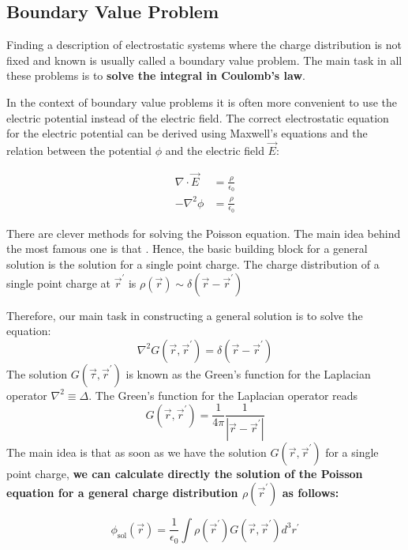 \subsection{Boundary Value Problem}
Finding a description of electrostatic systems where the charge distribution is not fixed and known is usually called a boundary value problem. The main task in all these problems is to \textbf{solve the integral in Coulomb’s law}.

In the context of boundary value problems it is often more convenient to use the electric potential instead of the electric field. The correct electrostatic equation for the electric potential can be derived using Maxwell's equations and the relation between the potential $\phi$ and the electric field $\vec{E}$:
\begin{qt}
\begin{equation}
\begin{aligned}
\nabla \cdot \vec{E} &=\frac{\rho}{\epsilon_{0}} \\
-\nabla^{2} \phi &=\frac{\rho}{\epsilon_{0}}
\end{aligned}
\end{equation}
\end{qt}
There are clever methods for solving the Poisson equation. The main idea behind the most famous one is that \textbf{}. Hence, the basic building block for a general solution is the solution for a single point charge. The charge distribution of a single point charge at $\vec{r}^{\prime}$ is $\rho(\vec{r}) \sim \delta\left(\vec{r}-\vec{r}^{\prime}\right)$

Therefore, our main task in constructing a general solution is to solve the equation:
\begin{equation}
\nabla^{2} G\left(\vec{r}, \vec{r}^{\prime}\right)=\delta\left(\vec{r}-\vec{r}^{\prime}\right)
\end{equation}
The solution $G\left(\vec{\tau}, \vec{r}^{\prime}\right)$ is known as the Green's function for the Laplacian operator $\nabla^{2} \equiv \Delta .$ The Green’s function for the Laplacian operator reads
\begin{equation}
G\left(\vec{r}, \vec{r}^{\prime}\right)=\frac{1}{4 \pi} \frac{1}{\left|\vec{r}-\vec{r}^{\prime}\right|}
\end{equation}
The main idea is that as soon as we have the solution $G\left(\vec{r}, \vec{r}^{\prime}\right)$ for a single point charge, \textbf{we can calculate directly the solution of the Poisson equation for a general charge distribution $\rho\left(\vec{r}^{\prime}\right)$ as follows:}
\begin{qt}
\begin{equation}
\phi_{\mathrm{sol}}(\vec{r})=\frac{1}{\epsilon_{0}} \int \rho\left(\vec{r}^{\prime}\right) G\left(\vec{r}, \vec{r}^{\prime}\right) d^{3} r^{\prime}
\end{equation}
\end{qt}

